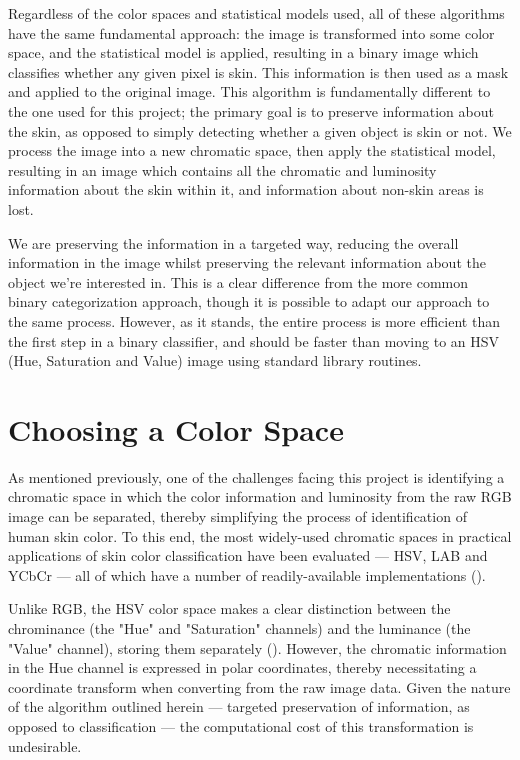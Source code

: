 Regardless of the color spaces and statistical models used, all of these algorithms have the same fundamental approach: the image is transformed into some color space, and the statistical model is applied, resulting in a binary image which classifies whether any given pixel is skin. This information is then used as a mask and applied to the original image. This algorithm is fundamentally different to the one used for this project; the primary goal is to preserve information about the skin, as opposed to simply detecting whether a given object is skin or not. We process the image into a new chromatic space, then apply the statistical model, resulting in an image which contains all the chromatic and luminosity information about the skin within it, and information about non-skin areas is lost. 

We are preserving the information in a targeted way, reducing the overall information in the image whilst preserving the relevant information about the object we're interested in. This is a clear difference from the more common binary categorization approach, though it is possible to adapt our approach to the same process. However, as it stands, the entire process is more efficient than the first step in a binary classifier, and should be faster than moving to an HSV (Hue, Saturation and Value) image using standard library routines.


\section{Choosing a Color Space}

As mentioned previously, one of the challenges facing this project is identifying a chromatic space in which the color information and luminosity from the raw RGB image can be separated, thereby simplifying the process of identification of human skin color. To this end, the most widely-used chromatic spaces in practical applications of skin color classification have been evaluated --- HSV, LAB and YCbCr --- all of which have a number of readily-available implementations (\cite{Vezhnevets2003,Zarit1999a,Yang1997a,Brand2000a,Sigal2000a,Chai2000a,Phung2002a}).

Unlike RGB, the HSV color space makes a clear distinction between the chrominance (the "Hue" and "Saturation" channels) and the luminance (the "Value" channel), storing them separately (\cite{Vezhnevets2003,Sigal2000a}). However, the chromatic information in the Hue channel is expressed in polar coordinates, thereby necessitating a coordinate transform when converting from the raw image data. Given the nature of the algorithm outlined herein --- targeted preservation of information, as opposed to classification ---  the computational cost of this transformation is undesirable.

